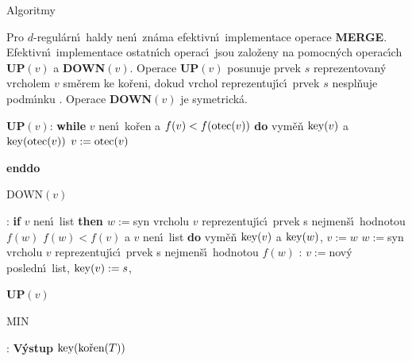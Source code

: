 \head
Algoritmy
\endhead

\flushpar Pro $d$-regul\'arn\'\i\ haldy nen\'\i\ zn\'ama efektivn\'\i\ implementace operace 
{\bf MERGE}.  Efektivn\'\i\ implementace 
ostatn\'\i ch operac\'\i\ jsou zalo\v zeny na pomocn\'ych 
operac\'\i ch {\bf UP$(v)$} a {\bf DOWN$(v)$}.  Ope\-race {\bf UP$
(v)$} posunuje 
prvek $s$ reprezentovan\'y vrcholem $v$ sm\v erem ke ko\v reni, 
dokud vrchol reprezentuj\'\i c\'\i\ prvek $s$ nespl\v nu\-je podm\'\i nku 
.  Operace {\bf DOWN$(v)$} je symetrick\'a.  
\bigskip
 

{\bf UP$(v)$}:\newline 
{\bf while} $v$ nen\'\i\ ko\v ren a $f(v)<f(\operatorname{otec}(v))$ {\bf do\newline 
\phantom{{\rm ---}}}vym\v e\v n $\operatorname{key}(v)$ a $\operatorname{key}(\operatorname{otec}(v))$\newline 
\phantom{---}$v:=\operatorname{otec}(v)$\newline 
{\bf enddo
\bigskip

DOWN$(v)$}:\newline 
{\bf if} $v$ nen\'\i\ list {\bf then\newline 
\phantom{{{\rm ---}}}$w:=$}syn vrcholu $v$ reprezentuj\'\i c\'\i\ prvek s nejmen\v s\'\i\ 
hodnotou $f(w)$\newline 
\phantom{---}{\bf while} $f(w)<f(v)$ a $v$ nen\'\i\ list {\bf do\newline 
\phantom{{\rm ------}}}vym\v e\v n $\operatorname{key}(v)$ a $\operatorname{key}(w)$, $v:=w$\newline 
\phantom{------}$w:=$syn vrcholu $v$ reprezentuj\'\i c\'\i\ prvek s nejmen\v s\'\i\ 
hodnotou $f(w)$\newline 
\phantom{---}{\bf enddo\newline 
endif
\bigskip

INSERT$(s)$}:\newline 
$v:=$nov\'y posledn\'\i\ list, $\operatorname{key}(v):=s$, {\bf UP$(v)$
\bigskip

MIN}:\newline 
{\bf V\'ystup} $\key(\text{\rm ko\v ren}(T))$
\bigskip

